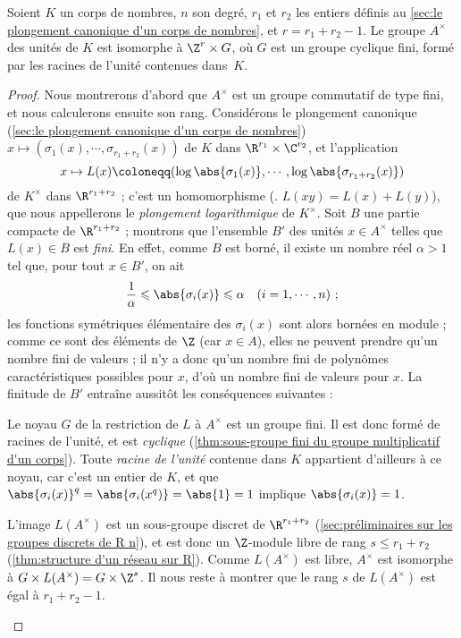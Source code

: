\documentclass[11pt, %
  title in boldface,
  theorem in new line,
  theorem numbering = section,
  number theorems separately,
  simple name,
]{beaulivre}
\begin{document}
    \begin{theorem}[Dirichlet]\label{thm:unité}
        Soient \( K \) un corps de nombres, \( n \) son degré, \( r_1 \) et \( r_2 \) les entiers définis au \cref{sec:le plongement canonique d'un corps de nombres}, et \( r = r_1 + r_2 - 1 \). Le groupe \( A^\times \) des unités de \( K \) est isomorphe à \( \Z^r \times G \), où \( G \) est un groupe cyclique fini, formé par les racines de l'unité contenues dans~\( K \).
    \end{theorem}
    \begin{proof}
        Nous montrerons d'abord que \( A^\times \) est un groupe commutatif de type fini, et nous calculerons ensuite son rang. Considérons le plongement canonique (\cref{sec:le plongement canonique d'un corps de nombres}) \( x \mapsto (\sigma_1(x), \cdots, \sigma_{r_1+r_2}(x)) \) de \( K \) dans \( \R^{r_1} \times \C^{r_2} \), et l'application
        \begin{equation}
            x \mapsto L(x) \coloneqq (\log\abs{\sigma_1(x)}, \cdots, \log\abs{\sigma_{r_1+r_2}(x)})
        \end{equation}
        de \( K^\times \) dans \( \R^{r_1+r_2} \) ; c'est un homomorphisme (\ie. \( L(xy) = L(x)+L(y) \)), que nous appellerons le \emph{plongement logarithmique} de \( K^\times \). Soit \( B \) une partie compacte de \( \R^{r_1+r_2} \) ; montrons que l'ensemble \( B' \) des unités \( x \in A^\times \) telles que \( L(x) \in B \) est \emph{fini}. En effet, comme \( B \) est borné, il existe un nombre réel \( \alpha > 1 \) tel que, pour tout \( x \in B' \), on ait
        \[
            \frac{1}{\alpha} \leqslant \abs{\sigma_i(x)} \leqslant \alpha \quad \text{(\( i = 1, \cdots, n \))} ~;
        \]
        les fonctions symétriques élémentaire des \( \sigma_i(x) \) sont alors bornées en module ; comme ce sont des éléments de \( \Z \) (car \( x \in A \)), elles ne peuvent prendre qu'un nombre fini de valeurs ; il n'y a donc qu'un nombre fini de polynômes caractéristiques possibles pour \( x \), d'où un nombre fini de valeurs pour \( x \). La finitude de \( B' \) entraîne aussitôt les conséquences suivantes :
        \begin{enumerate-alph}
            \item Le noyau \( G \) de la restriction de \( L \) à \( A^\times \) est un groupe fini. Il est donc formé de racines de l'unité, et est \emph{cyclique} (\cref{thm:sous-groupe fini du groupe multiplicatif d'un corps}). Toute \emph{racine de l'unité} contenue dans \( K \) appartient d'ailleurs à ce noyau, car c'est un entier de \( K \), et que \( \abs{\sigma_i(x)}^q = \abs{\sigma_i(x^q)} = \abs{1} = 1 \) implique \( \abs{\sigma_i(x)} = 1 \).
            \item L'image \( L(A^\times) \) est un sous-groupe discret de \( \R^{r_1+r_2} \) (\cref{sec:préliminaires sur les groupes discrets de R n}), et est donc un \( \Z \)‑module libre de rang \( s \leqslant r_1+r_2 \) (\cref{thm:structure d'un réseau sur R}). Comme \( L(A^\times) \) est libre, \( A^\times \) est isomorphe à \( G \times L(A^\times) = G \times \Z^{s} \). Il nous reste à montrer que le rang \( s \) de \( L(A^\times) \) est égal à \( r_1+r_2-1 \).
        \end{enumerate-alph}


\end{proof}
\end{document}
